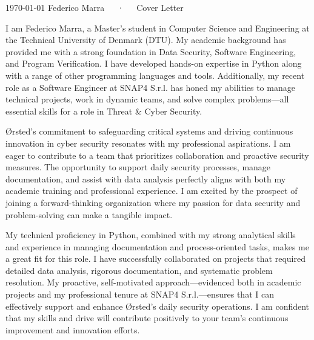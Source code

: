 \documentclass[11pt, a4paper]{awesome-cv}
\begin{document}
\makecvheader[R]

\makecvfooter
  {\today}
  {Federico Marra~~~·~~~Cover Letter}
  {}

\makelettertitle

\begin{cvletter}

I am Federico Marra, a Master’s student in Computer Science and Engineering at the Technical University of Denmark (DTU). My academic background has provided me with a strong foundation in Data Security, Software Engineering, and Program Verification. I have developed hands-on expertise in Python along with a range of other programming languages and tools. Additionally, my recent role as a Software Engineer at SNAP4 S.r.l. has honed my abilities to manage technical projects, work in dynamic teams, and solve complex problems—all essential skills for a role in Threat \& Cyber Security.

Ørsted’s commitment to safeguarding critical systems and driving continuous innovation in cyber security resonates with my professional aspirations. I am eager to contribute to a team that prioritizes collaboration and proactive security measures. The opportunity to support daily security processes, manage documentation, and assist with data analysis perfectly aligns with both my academic training and professional experience. I am excited by the prospect of joining a forward-thinking organization where my passion for data security and problem-solving can make a tangible impact.

My technical proficiency in Python, combined with my strong analytical skills and experience in managing documentation and process-oriented tasks, makes me a great fit for this role. I have successfully collaborated on projects that required detailed data analysis, rigorous documentation, and systematic problem resolution. My proactive, self-motivated approach—evidenced both in academic projects and my professional tenure at SNAP4 S.r.l.—ensures that I can effectively support and enhance Ørsted’s daily security operations. I am confident that my skills and drive will contribute positively to your team’s continuous improvement and innovation efforts.

\end{cvletter}

\makeletterclosing
\end{document}
